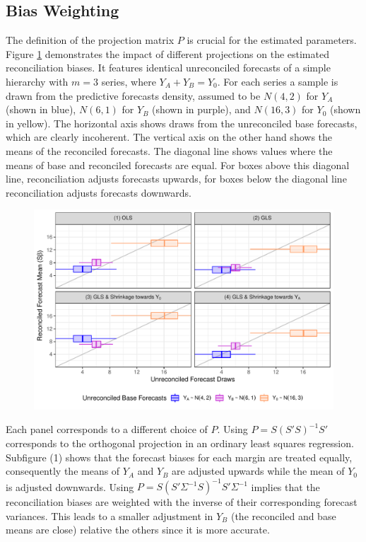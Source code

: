 \documentclass[a4paper,fleqn,11pt]{article}
\begin{document}
\subsection{Bias Weighting}\label{sec:weighting}

The definition of the projection matrix $P$ is crucial for the estimated parameters. Figure \ref{fig:weights} demonstrates the impact of different projections on the estimated reconciliation biases. It features identical unreconciled forecasts of a simple hierarchy with $m=3$ series, where $Y_A + Y_B = Y_0$. For each series a sample is drawn from the predictive forecasts density, assumed to be $N(4,2)$ for $Y_A$ (shown in blue), $N(6,1)$ for $Y_B$ (shown in purple), and $N(16,3)$ for $Y_0$ (shown in yellow). The horizontal axis shows draws from the unreconciled base forecasts, which are clearly incoherent. The vertical axis on the other hand shows the means of the reconciled forecasts. The diagonal line shows values where the means of base and reconciled forecasts are equal. For boxes above this diagonal line, reconciliation adjusts forecasts upwards, for boxes below the diagonal line reconciliation adjusts forecasts downwards.

\begin{figure}[H]
	\includegraphics[width=\textwidth]{fig/fig_biases}
	\label{fig:weights}
\end{figure}

Each panel corresponds to a different choice of $P$. Using $P = S(S'S)^{-1}S'$ corresponds to the orthogonal projection in an ordinary least squares regression. Subfigure (1) shows that the forecast biases for each margin are treated equally, consequently the means of $Y_A$ and $Y_B$ are adjusted upwards while the mean of $Y_0$ is adjusted downwards. Using $P = S(S'\Sigma^{-1}S)^{-1}S'\Sigma^{-1}$ implies that the reconciliation biases are weighted with the inverse of their corresponding forecast variances. This leads to a smaller adjustment in $Y_B$ (the reconciled and base means are close) relative the others since it is more accurate.
\end{document}
